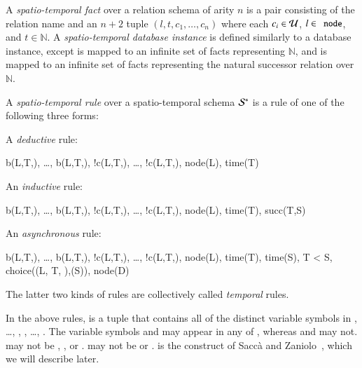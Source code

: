 A {\em spatio-temporal fact} over a relation schema of arity $n$ is a pair consisting of the relation name and an $n+2$ tuple $(l,t,c_1,\ldots,c_n)$ where each $c_i \in \univ$, $l \in \dedalus{node}$, and $t \in \mathbb{N}$.  A {\em spatio-temporal database instance} is defined similarly to a database instance, except  is mapped to an infinite set of  facts representing $\mathbb{N}$, and  is mapped to an infinite set of  facts representing the natural successor relation over $\mathbb{N}$.

A {\em spatio-temporal rule} over a spatio-temporal schema $\stschema$ is a rule of one of the following three forms:


A {\em deductive} rule:

\begin{Drules}
        {b(L,T,), \ldots, b(L,T,), !c(L,T,), \ldots, !c(L,T,), node(L), time(T)}
\end{Drules}

An {\em inductive} rule:

\begin{Drules}
        {b(L,T,), \ldots, b(L,T,), !c(L,T,), \ldots, !c(L,T,), node(L), time(T), succ(T,S)}
\end{Drules}

An {\em asynchronous} rule:

\begin{Drules}
        {b(L,T,), \ldots, b(L,T,),
          !c(L,T,), \ldots, !c(L,T,),
          node(L), time(T), time(S), T < S, choice((L, T, ),(S)), node(D)}
\end{Drules}

The latter two kinds of rules are collectively called {\em temporal} rules.

In the above rules,  is a tuple that contains all of the distinct variable symbols in  , \ldots, , , \ldots, .  The variable symbols  and  may appear in any of , whereas  and  may not.   may not be , , or .   may not be  or .   is the construct of
Sacc\`{a} and Zaniolo~\cite{sacca-zaniolo}, which we will describe later.

